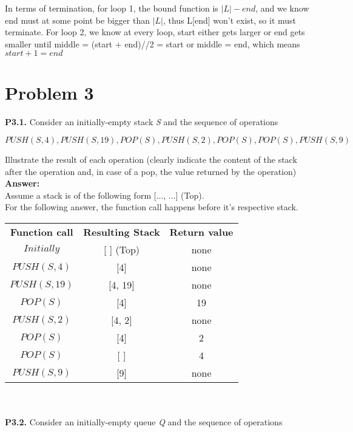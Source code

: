 \documentclass{article}
\begin{document}
In terms of termination, for loop 1, the bound function is $|L| - end$, and we know end must at some point be bigger than $|L|$, thus L[end] won't exist, so it must terminate. For loop 2, we know at every loop, start either gets larger or end gets smaller until middle = (start + end)//2 = start or middle = end, which means $start+1 = end$

\section*{Problem 3}
\textbf{P3.1.} Consider an initially-empty stack \textit{S} and the sequence of operations
\\
\vspace{-10pt}
\begin{center}
    $PUSH(S,4), PUSH(S,19), POP(S), PUSH(S,2), POP(S), POP(S), PUSH(S,9)$
\end{center}

\noindent
Illustrate the result of each operation (clearly indicate the content of the stack after the operation and, in case of a pop, the value returned by the operation)\\

\noindent \textbf{Answer: }\\
Assume a stack is of the following form [..., ...] (Top).\\
For the following answer, the function call happens before it's respective stack.\\
\noindent

\bgroup
\def\arraystretch{1.2}
\begin{tabular}{ c c c }
    \textbf{Function call} & \textbf{Resulting Stack} & \textbf{Return value}\\
    $Initially$ & [ ] (Top) & none\\
    $PUSH(S,4)$ & [4] & none\\
    $PUSH(S,19)$ & [4, 19] & none\\
    $POP(S)$ & [4] & 19\\
    $PUSH(S,2)$ & [4, 2] & none\\
    $POP(S)$ & [4] & 2\\
    $POP(S)$ & [ ] & 4\\
    $PUSH(S,9)$ & [9] & none\\
\end{tabular}
\egroup\\\\


\noindent
\textbf{P3.2.} Consider an initially-empty queue \textit{Q} and the sequence of operations
\end{document}
